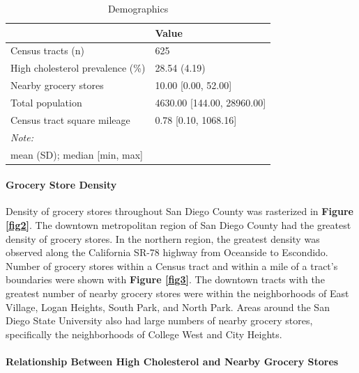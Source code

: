 \documentclass[]{elsarticle} %
\begin{document}
\begin{table}

\caption{\label{tab:tableone_print}Demographics}
\centering
\begin{tabular}[t]{ll}
\toprule
  & Value\\
\midrule
Census tracts (n) & 625\\
High cholesterol prevalence (\%) & 28.54 (4.19)\\
Nearby grocery stores & 10.00 [0.00, 52.00]\\
Total population & 4630.00 [144.00, 28960.00]\\
Census tract square mileage & 0.78 [0.10, 1068.16]\\
\bottomrule
\multicolumn{2}{l}{\rule{0pt}{1em}\textit{Note: }}\\
\multicolumn{2}{l}{\rule{0pt}{1em}mean (SD); median [min, max]}\\
\end{tabular}
\end{table}

\hypertarget{grocery-store-density}{%
\paragraph{Grocery Store Density}\label{grocery-store-density}}

Density of grocery stores throughout San Diego County was rasterized in
\textbf{Figure \ref{fig2}}. The downtown metropolitan region of San
Diego County had the greatest density of grocery stores. In the northern
region, the greatest density was observed along the California SR-78
highway from Oceanside to Escondido. Number of grocery stores within a
Census tract and within a mile of a tract's boundaries were shown with
\textbf{Figure \ref{fig3}}. The downtown tracts with the greatest number
of nearby grocery stores were within the neighborhoods of East Village,
Logan Heights, South Park, and North Park. Areas around the San Diego
State University also had large numbers of nearby grocery stores,
specifically the neighborhoods of College West and City Heights.

\hypertarget{relationship-between-high-cholesterol-and-nearby-grocery-stores}{%
\paragraph{Relationship Between High Cholesterol and Nearby Grocery
Stores}\label{relationship-between-high-cholesterol-and-nearby-grocery-stores}}
\end{document}
